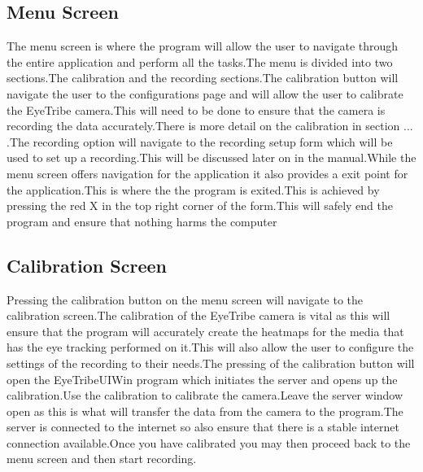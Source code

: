 \subsection{Menu Screen}
The menu screen is where the program will allow the user to navigate through the entire application and perform all the tasks.The menu is divided into two sections.The calibration and the recording sections.The calibration button will navigate the user to the configurations page and will allow the user to calibrate the EyeTribe camera.This will need to be done to ensure that the camera is recording the data accurately.There is more detail on the calibration in section ... .The recording option will navigate to the recording setup form which will be used to set up a recording.This will be discussed later on in the manual.While the menu screen offers navigation for the application it also provides a exit point for the application.This is where the the program is exited.This is achieved by pressing the red X in the top right corner of the form.This will safely end the program and ensure that nothing harms the computer

\subsection{Calibration Screen}
Pressing the calibration button on the menu screen will navigate to the calibration screen.The calibration of the EyeTribe camera is vital as this will ensure that the program will accurately create the heatmaps for the media that has the eye tracking performed on it.This will also allow the user to configure the settings of the recording to their needs.The pressing of the calibration button will open the EyeTribeUIWin program which initiates the server and opens up the calibration.Use the calibration to calibrate the camera.Leave the server window open as this is what will transfer the data from the camera to the program.The server is connected to the internet so also ensure that there is a stable internet connection available.Once you have calibrated you may then proceed back to the menu screen and then start recording.

